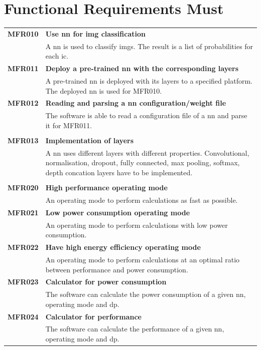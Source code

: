 \documentclass[parskip=full]{scrartcl}
\begin{document}
\section{Functional Requirements Must}
\begin{tabular}{p{2cm}p{12cm}}
\textbf{MFR010} & \textbf{Use \gls{nn} for \gls{img} classification}\\                                     
& A \gls{nn} is used to classify \glspl{img}. The result is a list of probabilities for each \gls{ic}.\\
\textbf{MFR011} & \textbf{Deploy a pre-trained \gls{nn} with the corresponding layers}\\
& A pre-trained \gls{nn} is deployed with its layers to a specified platform. The deployed \gls{nn} is used for MFR010.\\
\textbf{MFR012} & \textbf{Reading and parsing a \gls{nn} configuration/weight file}\\
& The software is able to read a configuration file of a \gls{nn} and parse it for MFR011.\\
& \\
\textbf{MFR013} & \textbf{Implementation of layers}\\
& A \gls{nn} uses different layers with different properties. Convolutional, normalisation, dropout, fully connected, max pooling, softmax, depth concation layers have to be implemented. \\
& \\
\textbf{MFR020} & \textbf{High \gls{performance} operating mode}\\                                     
& An operating mode to perform calculations as fast as possible.\\
\textbf{MFR021} & \textbf{Low \gls{power consumption} operating mode}\\                                     
& An operating mode to perform calculations with low \gls{power consumption}.\\
\textbf{MFR022} & \textbf{Have high energy efficiency operating mode}\\                                     
& An operating mode to perform calculations at an optimal ratio between \gls{performance} and \gls{power consumption}.\\
\textbf{MFR023} & \textbf{Calculator for \gls{power consumption}}\\                                     
& The software can calculate the \gls{power consumption} of a given \gls{nn}, operating mode and \gls{dp}.\\
\textbf{MFR024} & \textbf{Calculator for \gls{performance}}\\                                     
& The software can calculate the \gls{performance} of a given \gls{nn}, operating mode and \gls{dp}.\\
\end{tabular}
\end{document}
